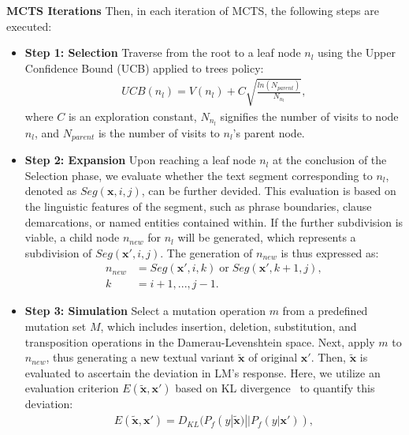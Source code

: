 \textbf{MCTS Iterations} Then, in each iteration of MCTS, the following steps are executed:
\begin{itemize}[leftmargin=*]
\item \textbf{Step 1: Selection} Traverse from the root to a leaf node $n_l$ using the Upper Confidence Bound (UCB) applied to trees policy:
\begin{equation}
\begin{aligned}
UCB(n_l) = V(n_l) + C\sqrt{\frac{ln(N_{parent})}{N_{n_l}}},
\end{aligned}
\label{eq: ucb}
\end{equation}
where $C$ is an exploration constant, $N_{n_l}$ signifies the number of visits to node $n_l$, and $N_{parent}$ is the number of visits to $n_l$'s parent node.

\item \textbf{Step 2: Expansion} Upon reaching a leaf node $n_l$ at the conclusion of the Selection phase, we evaluate whether the text segment corresponding to $n_l$, denoted as $Seg(\mathbf{x},i,j)$, can be further devided. This evaluation is based on the linguistic features of the segment, such as phrase boundaries, clause demarcations, or named entities contained within. If the further subdivision is viable, a child node $n_{new}$ for $n_l$ will be generated, which represents a subdivision of $Seg(\mathbf{x}',i,j)$. The generation of $n_{new}$ is thus expressed as:
\begin{equation}
\begin{aligned}
n_{new} &= Seg(\mathbf{x}',i,k) \; \text{or} \; Seg(\mathbf{x}',k+1,j), \\
k&=i+1,...,j-1.
\end{aligned}
\label{eq: expansion}
\end{equation}
\item \textbf{Step 3: Simulation} Select a mutation operation $m$ from a predefined mutation set $M$, which includes insertion, deletion, substitution, and transposition operations in the Damerau-Levenshtein space. Next, apply $m$ to $n_{new}$, thus generating a new textual variant $\tilde{\mathbf{x}}$ of original $\mathbf{x}'$. Then, $\tilde{\mathbf{x}}$ is evaluated to ascertain the deviation in LM's response. Here, we utilize an evaluation criterion $E(\tilde{\mathbf{x}}, \mathbf{x}')$ based on KL divergence~\citep{kullback1951information} to quantify this deviation:
\begin{equation}
\begin{aligned}
E(\tilde{\mathbf{x}}, \mathbf{x}') = D_{KL} (P_{f}(y|\tilde{\mathbf{x}})||P_{f}(y|\mathbf{x}')),

\end{aligned}
\end{equation}
\end{itemize}
